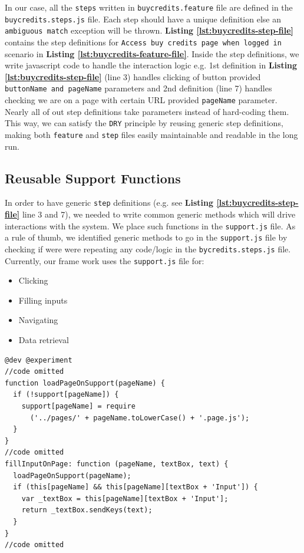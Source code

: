 In our case, all the \texttt{steps} written in \texttt{buycredits.feature} file are defined in the \texttt{buycredits.steps.js} file. Each step should have a unique definition else an \texttt{ambiguous match} exception will be thrown. \textbf{Listing \ref{lst:buycredits-step-file}} contains the step definitions for \texttt{Access buy credits page when logged in} scenario in \textbf{Listing \ref{lst:buycredits-feature-file}}. Inside the step definitions, we write javascript code to handle the interaction logic e.g. 1st definition in \textbf{Listing \ref{lst:buycredits-step-file}} (line 3) handles clicking of button provided  \texttt{buttonName and pageName} parameters and 2nd definition (line 7) handles checking we are on a page with certain URL provided  \texttt{pageName} parameter. Nearly all of out step definitions take parameters instead of hard-coding them. This way, we can satisfy the \texttt{DRY} principle by reusing generic step definitions, making both  \texttt{feature} and  \texttt{step} files easily maintainable and readable in the long run.

\subsection{Reusable Support Functions}
\label{subsec:reusable-support-functions}

In order to have generic \texttt{step} definitions (e.g. see \textbf{Listing \ref{lst:buycredits-step-file}} line 3 and 7), we needed to write common generic methods which will drive interactions with the system. We place such functions in the \texttt{support.js} file. As a rule of thumb, we identified generic methods to go in the \texttt{support.js} file by checking if were were repeating any code/logic in the \texttt{bycredits.steps.js} file. Currently, our frame work uses the \texttt{support.js} file for:

\begin{itemize}
\item Clicking
\item Filling inputs
\item Navigating
\item Data retrieval
\end{itemize}

\begin{listing}[H]
\begin{verbatim}
@dev @experiment
//code omitted
function loadPageOnSupport(pageName) {
  if (!support[pageName]) {
    support[pageName] = require
      ('../pages/' + pageName.toLowerCase() + '.page.js');
  }
}
//code omitted
fillInputOnPage: function (pageName, textBox, text) {
  loadPageOnSupport(pageName);
  if (this[pageName] && this[pageName][textBox + 'Input']) {
    var _textBox = this[pageName][textBox + 'Input'];
    return _textBox.sendKeys(text);
  }
}
//code omitted
\end{verbatim}
\label{lst:support-file-methods}
\end{listing}

